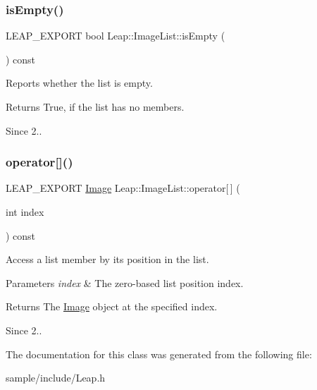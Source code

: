 \subsubsection{\texorpdfstring{is\+Empty()}{isEmpty()}}
{\footnotesize\ttfamily L\+E\+A\+P\+\_\+\+E\+X\+P\+O\+RT bool Leap\+::\+Image\+List\+::is\+Empty (\begin{DoxyParamCaption}{ }\end{DoxyParamCaption}) const}

Reports whether the list is empty.


\begin{DoxyCodeInclude}
\end{DoxyCodeInclude}


\begin{DoxyReturn}{Returns}
True, if the list has no members. 
\end{DoxyReturn}
\begin{DoxySince}{Since}
2.. 
\end{DoxySince}
\mbox{\label{class_leap_1_1_image_list_af1b9a66c27379ec4fd6b7bc0e5936b51}} 
\subsubsection{\texorpdfstring{operator[]()}{operator[]()}}
{\footnotesize\ttfamily L\+E\+A\+P\+\_\+\+E\+X\+P\+O\+RT \hyperlink{class_leap_1_1_image}{Image} Leap\+::\+Image\+List\+::operator\mbox{[}$\,$\mbox{]} (\begin{DoxyParamCaption}\item[{int}]{index }\end{DoxyParamCaption}) const}

Access a list member by its position in the list. 
\begin{DoxyParams}{Parameters}
{\em index} & The zero-\/based list position index. \\
\hline
\end{DoxyParams}
\begin{DoxyReturn}{Returns}
The \hyperlink{class_leap_1_1_image}{Image} object at the specified index. 
\end{DoxyReturn}
\begin{DoxySince}{Since}
2.. 
\end{DoxySince}


The documentation for this class was generated from the following file\+:\begin{DoxyCompactItemize}
\item 
sample/include/Leap.\+h\end{DoxyCompactItemize}
